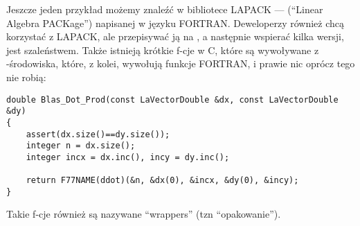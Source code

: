 Jeszcze jeden przykład możemy znaleźć w bibliotece LAPACK --- (``Linear Algebra PACKage'') napisanej w języku FORTRAN.
Deweloperzy \CCpp również chcą korzystać z LAPACK, ale przepisywać ją na \CCpp, a następnie wspierać kilka wersji,
jest szaleństwem.
Także istnieją krótkie f-cje w C, które są wywoływane z \CCpp{}-środowiska, które, z kolei, wywołują funkcje FORTRAN,
i prawie nic oprócz tego nie robią:

\begin{lstlisting}[style=customc]
double Blas_Dot_Prod(const LaVectorDouble &dx, const LaVectorDouble &dy)
{
    assert(dx.size()==dy.size());
    integer n = dx.size();
    integer incx = dx.inc(), incy = dy.inc();

    return F77NAME(ddot)(&n, &dx(0), &incx, &dy(0), &incy);
}
\end{lstlisting}

Takie f-cje również są nazywane ``wrappers'' (tzn ``opakowanie'').


